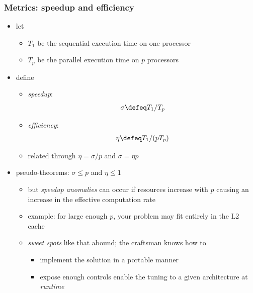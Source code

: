 \begin{frame}[fragile]
%
  \frametitle{Metrics: speedup and efficiency}
%
  \begin{itemize}
%
    \item let
      \begin{itemize}
        \item $T_{1}$ be the sequential execution time on one processor
        \item $T_{p}$ be the parallel execution time on $p$ processors
      \end{itemize}
%
    \item define
      \begin{itemize}
        \item {\em speedup}: \[\sigma \defeq T_{1}/T_{p}\]
        \item {\em efficiency}: \[\eta \defeq T_{1}/(p T_{p})\]
        \item related through $\eta = \sigma/p$ and $\sigma = \eta p$
      \end{itemize}
%
    \item pseudo-theorems: $\sigma \leq p$ and $\eta \leq 1$
      \begin{itemize}
        \item but {\em speedup anomalies} can occur if resources increase with $p$ causing an
          increase in the effective computation rate
        \item example: for large enough $p$, your problem may fit entirely in the L2 cache
        \item {\em sweet spots} like that abound; the craftsman knows how to
          \begin{itemize}
            \item implement the solution in a portable manner
            \item expose enough controls enable the tuning to a given architecture at {\em
              runtime}
          \end{itemize}
      \end{itemize}
%
  \end{itemize}
%
\end{frame}


